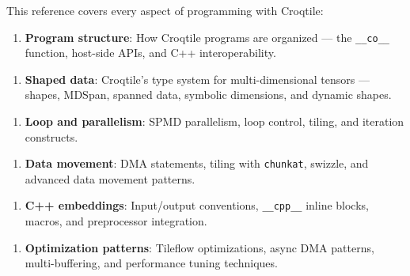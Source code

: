 This reference covers every aspect of programming with Croqtile:

\begin{enumerate}[leftmargin=1.6em]
\item \textbf{Program structure}: How Croqtile programs are organized --- the \texttt{\_\_co\_\_} function, host-side APIs, and C++ interoperability.
\end{enumerate}

\begin{enumerate}[leftmargin=1.6em]
\item \textbf{Shaped data}: Croqtile's type system for multi-dimensional tensors --- shapes, MDSpan, spanned data, symbolic dimensions, and dynamic shapes.
\end{enumerate}

\begin{enumerate}[leftmargin=1.6em]
\item \textbf{Loop and parallelism}: SPMD parallelism, loop control, tiling, and iteration constructs.
\end{enumerate}

\begin{enumerate}[leftmargin=1.6em]
\item \textbf{Data movement}: DMA statements, tiling with \texttt{chunkat}, swizzle, and advanced data movement patterns.
\end{enumerate}

\begin{enumerate}[leftmargin=1.6em]
\item \textbf{C++ embeddings}: Input/output conventions, \texttt{\_\_cpp\_\_} inline blocks, macros, and preprocessor integration.
\end{enumerate}

\begin{enumerate}[leftmargin=1.6em]
\item \textbf{Optimization patterns}: Tileflow optimizations, async DMA patterns, multi-buffering, and performance tuning techniques.
\end{enumerate}
